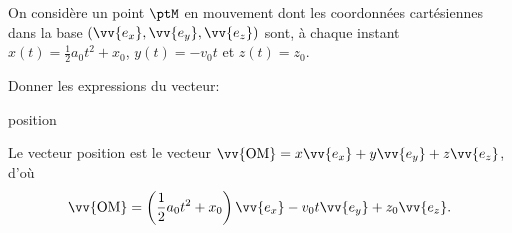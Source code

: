 \finEntrainement









\hauteurLargeurCadreReponse		{2.5cm}{2cm}
\initialisationEntrainement

On considère un point $\ptM$ en mouvement dont les coordonnées cartésiennes dans la base $(\vv{e_x},\vv{e_y},\vv{e_z})$ sont, à chaque instant $x(t)=\frac12 a_0t^2 + x_0$, $y(t)=-v_0t$ et $z(t) = z_0$. 

Donner les expressions du vecteur:

\debutEntrainement

\begin{enonce}
	 position
\end{enonce}


\begin{corrige}
	Le vecteur position est le vecteur $\vv{\text{OM}}=x\vv{e_x}+y\vv{e_y}+z\vv{e_z}$, d'où 
	\[
	\vv{\text{OM}} =\left(\frac12 a_0 t^2 + x_0\right)\vv{e_x} - v_0 t \vv{e_y} + z_0 \vv{e_z}.
	\]
\end{corrige}

